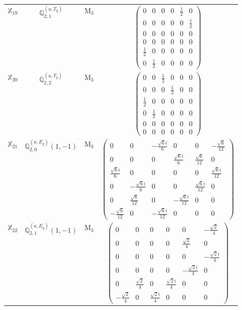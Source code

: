 \documentclass[fleqn,10pt,landscape]{article}
\begin{document}
\begin{itemize}
\begin{center}
\begin{longtable}{c|c|c|c}
$ \mathbb{X}_{19} $ & $\mathbb{Q}_{2,1}^{(a,T_{g})}$ & M$_{3}$ & $\begin{pmatrix} 0 & 0 & 0 & 0 & \frac{1}{2} & 0 \\ 0 & 0 & 0 & 0 & 0 & \frac{1}{2} \\ 0 & 0 & 0 & 0 & 0 & 0 \\ 0 & 0 & 0 & 0 & 0 & 0 \\ \frac{1}{2} & 0 & 0 & 0 & 0 & 0 \\ 0 & \frac{1}{2} & 0 & 0 & 0 & 0 \end{pmatrix}$ \\
$ \mathbb{X}_{20} $ & $\mathbb{Q}_{2,2}^{(a,T_{g})}$ & M$_{3}$ & $\begin{pmatrix} 0 & 0 & \frac{1}{2} & 0 & 0 & 0 \\ 0 & 0 & 0 & \frac{1}{2} & 0 & 0 \\ \frac{1}{2} & 0 & 0 & 0 & 0 & 0 \\ 0 & \frac{1}{2} & 0 & 0 & 0 & 0 \\ 0 & 0 & 0 & 0 & 0 & 0 \\ 0 & 0 & 0 & 0 & 0 & 0 \end{pmatrix}$ \\
$ \mathbb{X}_{21} $ & $\mathbb{Q}_{2,0}^{(a,E_{g})}(1,-1)$ & M$_{3}$ & $\begin{pmatrix} 0 & 0 & - \frac{\sqrt{6} i}{6} & 0 & 0 & - \frac{\sqrt{6}}{12} \\ 0 & 0 & 0 & \frac{\sqrt{6} i}{6} & \frac{\sqrt{6}}{12} & 0 \\ \frac{\sqrt{6} i}{6} & 0 & 0 & 0 & 0 & \frac{\sqrt{6} i}{12} \\ 0 & - \frac{\sqrt{6} i}{6} & 0 & 0 & \frac{\sqrt{6} i}{12} & 0 \\ 0 & \frac{\sqrt{6}}{12} & 0 & - \frac{\sqrt{6} i}{12} & 0 & 0 \\ - \frac{\sqrt{6}}{12} & 0 & - \frac{\sqrt{6} i}{12} & 0 & 0 & 0 \end{pmatrix}$ \\
$ \mathbb{X}_{22} $ & $\mathbb{Q}_{2,1}^{(a,E_{g})}(1,-1)$ & M$_{3}$ & $\begin{pmatrix} 0 & 0 & 0 & 0 & 0 & - \frac{\sqrt{2}}{4} \\ 0 & 0 & 0 & 0 & \frac{\sqrt{2}}{4} & 0 \\ 0 & 0 & 0 & 0 & 0 & - \frac{\sqrt{2} i}{4} \\ 0 & 0 & 0 & 0 & - \frac{\sqrt{2} i}{4} & 0 \\ 0 & \frac{\sqrt{2}}{4} & 0 & \frac{\sqrt{2} i}{4} & 0 & 0 \\ - \frac{\sqrt{2}}{4} & 0 & \frac{\sqrt{2} i}{4} & 0 & 0 & 0 \end{pmatrix}$ \\

\end{longtable}
\end{center}
\end{itemize}
\end{document}
